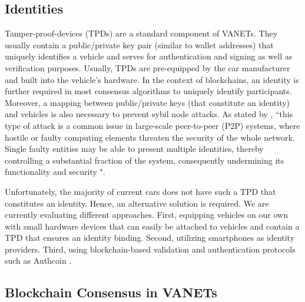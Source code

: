\documentclass{llncs}
\begin{document}
{		%

		\subsection{Identities}
			\label{ss:identities}
		
			Tamper-proof-devices (TPDs) are a standard component of VANETs. They usually contain a public/private key pair (similar to wallet addresses) that uniquely identifies a vehicle and serves for authentication and signing as well as verification purposes. Usually, TPDs are pre-equipped by the car manufacturer and built into the vehicle's hardware. In the context of blockchains, an identity is further required in most consensus algorithms to uniquely identify participants. Moreover, a mapping between public/private keys (that constitute an identity) and vehicles is also necessary to prevent sybil node attacks. As stated by \cite{leidingUnchained}, ``this type of attack is a common issue in large-scale peer-to-peer (P2P) systems, where hostile or faulty computing elements threaten the security of the whole network. Single faulty entities may be able to present multiple identities, thereby controlling a substantial fraction of the system, consequently undermining its functionality and security \cite{douceur2002sybil}".	

			Unfortunately, the majority of current cars does not have such a TPD that constitutes an identity. Hence, an alternative solution is required. We are currently evaluating different approaches. First, equipping vehicles on our own with small hardware devices that can easily be attached to vehicles and contain a TPD that ensures an identity binding. Second, utilizing smartphones as identity providers. Third, using blockchain-based validation and authentication protocols such as Authcoin  \cite{leiding2017securing}\cite{AuthcoinLeiding2016MCIS}\cite{leiding2017mapping}.
		

		\subsection{Blockchain Consensus in VANETs}
			\label{ss:consensus}
			
}
\end{document}
